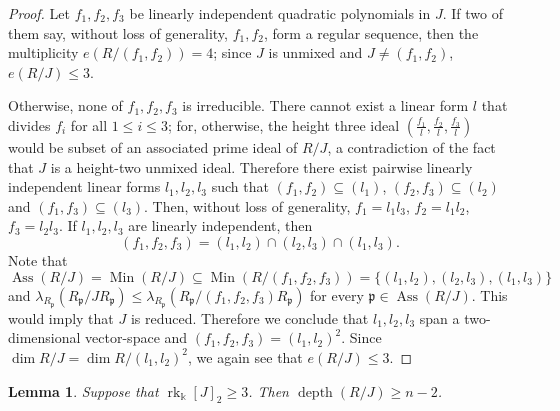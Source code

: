 \documentclass[11pt,a4paper]{amsart}
\theoremstyle{plain}
\newtheorem{lemma}[equation]{Lemma}
\theoremstyle{definition}
\newcommand{\frakp}{{\mathfrak p}}
\DeclareMathOperator{\rank}{rk}
\DeclareMathOperator{\Min}{Min}
\DeclareMathOperator{\depth}{depth}
\DeclareMathOperator{\Ass}{Ass}
\begin{document}
\begin{proof}
%
Let $f_1, f_2, f_3$ be linearly independent quadratic polynomials in $J$.
If two of them say, without loss of generality, $f_1, f_2$, 
form a regular sequence, then the multiplicity $e(R/(f_1, f_2)) = 4$; 
since $J$ is unmixed and $J \neq (f_1, f_2)$, $e(R/J) \leq 3$. 

Otherwise, none of $f_1, f_2, f_3$ is irreducible.
There cannot exist a linear form $l$ that divides $f_i$ for all $1 \leq i
\leq 3$; for, otherwise, the height three ideal
$\displaystyle \left( \frac{f_1}{l}, \frac{f_2}{l},
\frac{f_3}{l} \right)$ would be subset of an associated prime ideal of
$R/J$, a contradiction of the fact that $J$ is a height-two unmixed ideal.
Therefore there exist pairwise linearly independent linear forms $l_1, l_2,
l_3$ such that 
$(f_1, f_2 ) \subseteq (l_1)$, $(f_2, f_3 ) \subseteq (l_2)$ and
$(f_1, f_3 ) \subseteq (l_3)$. 
Then, without loss of generality, $f_1 = l_1l_3$, $f_2 = l_1l_2$, $f_3 =
l_2l_3$.
If $l_1, l_2, l_3$ are linearly independent, then 
\[
(f_1, f_2, f_3) = (l_1, l_2) \cap (l_2, l_3) \cap (l_1, l_3).
\]
Note that 
\[
\Ass(R/J) = \Min(R/J) \subseteq \Min(R/(f_1, f_2, f_3)) = 
\{(l_1, l_2) , (l_2, l_3) , (l_1, l_3) \}
\]
and $\lambda_{R_\frakp}(R_\frakp/JR_\frakp) \leq 
\lambda_{R_\frakp}(R_\frakp/(f_1, f_2, f_3)R_\frakp)$
for every $\frakp \in \Ass(R/J)$. This would imply that $J$ is reduced.
Therefore we conclude that 
$l_1, l_2, l_3$ span a two-dimensional vector-space
and $(f_1, f_2, f_3) = (l_1, l_2)^2$. Since $\dim R/J = \dim R/(l_1,
l_2)^2$, we again see that $e(R/J) \leq 3$.
\end{proof}

\begin{lemma}
\label{lemma:3quadDepth}
Suppose that  $\rank_\Bbbk[J]_2 \geq 3$.
Then $\depth (R/J) \geq n-2$.
\end{lemma}
\end{document}

